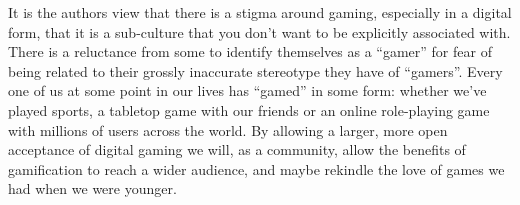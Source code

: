 It is the authors view that there is a stigma around gaming,
especially in a digital form, that it is a sub-culture that you don't
want to be explicitly associated with. There is a reluctance from some
to identify themselves as a ``gamer'' for fear of being related to
their grossly inaccurate stereotype they have of ``gamers''. Every one
of us at some point in our lives has ``gamed'' in some form: whether
we've played sports, a tabletop game with our friends or an online
role-playing game with millions of users across the world. By allowing
a larger, more open acceptance of digital gaming we will, as a
community, allow the benefits of gamification to reach a wider
audience, and maybe rekindle the love of games we had when we were
younger. 
